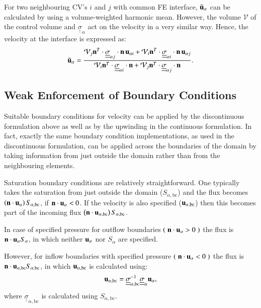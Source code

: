 \documentclass[preprint,authoryear,12pt]{elsarticle}
\newcommand{\frc}{\displaystyle\frac}
\begin{document}
For two neighbouring CV's $i$ and $j$ with common FE interface,
$\tilde{\bf u}_\alpha$ can be calculated by using a volume-weighted
harmonic mean. However, the volume $\mathcal{V}$ of the control volume
and $\underline{\underline{\sigma}}_{\alpha}$ act on the velocity in a
very similar way. Hence, the velocity at the interface is expressed
as:
\begin{equation} 
  {\tilde{\bf u}_\alpha} = \frc{ \mathcal{V}_{j} {\bf n}^T \cdot
    \underline{\underline{\sigma}}_{\alpha j}\cdot{\bf n} \, {\bf
      u}_{\alpha i} + \mathcal{V}_{i} {\bf n}^T
    \cdot\underline{\underline{\sigma}}_{\alpha i}\cdot{\bf n}\, {\bf
      u}_{\alpha j}} { \mathcal{V}_{i} {\bf n}^T
    \cdot\underline{\underline{\sigma}}_{\alpha i}\cdot{\bf n} +
    \mathcal{V}_{j} {\bf n}^T
    \cdot\underline{\underline{\sigma}}_{\alpha j}\cdot{\bf n} }.
\end{equation} 


\subsection{Weak Enforcement of Boundary Conditions}\label{bcs-rel-perm} 
Suitable boundary conditions for velocity can be applied by the
discontinuous formulation above as well as by the upwinding in the
continuous formulation. In fact, exactly the same boundary condition
implementations, as used in the discontinuous formulation, can be
applied across the boundaries of the domain by taking information from
just outside the domain rather than from the neighbouring elements.

Saturation boundary conditions are relatively straightforward. One
typically takes the saturation from just outside the domain
($S_{\alpha, \text{bc}}$) and the flux becomes $\left({\bf n}\cdot
{\bf u}_{\alpha}\right)S_{\alpha,\text{bc}}$, if ${\bf n}\cdot {\bf
  u}_{\alpha} < 0$. If the velocity is also specified (${\bf
  u}_{\alpha,\text{bc}}$) then this becomes part of the incoming flux
$\left({\bf n}\cdot {\bf
  u}_{\alpha,\text{bc}}\right)S_{\alpha,\text{bc}}$.

In case of specified pressure for outflow boundaries
$\left(\right.{\bf n}\cdot {\bf u}_\alpha>0\left.\right)$ the flux is
${\bf n}\cdot {\bf u}_\alpha {S_\alpha}$, in which neither ${\bf
  u}_\alpha$ nor ${S_\alpha}$ are specified.

However, for inflow boundaries with specified pressure
$\left(\right.{\bf n}\cdot {\bf u}_\alpha<0\left.\right)$ the flux is
${\bf n}\cdot {\bf u}_{\alpha,\text{bc}} S_{\alpha,\text{bc}}$, in
which ${\bf u}_{\alpha,\text{bc}}$ is calculated using:
\begin{equation}
  {\bf u}_{\alpha,\text{bc}} = 
    \underline{\underline{\sigma}}_{\alpha,\text{bc}} ^{-1}
    \underline{\underline{\sigma}}_{\alpha}  
              {\bf u}_{\alpha},
\end{equation}
where $\underline{\underline{\sigma}}_{\alpha,\text{bc}}$ is
calculated using $S_{\alpha,\text{bc}}$.
\end{document}
